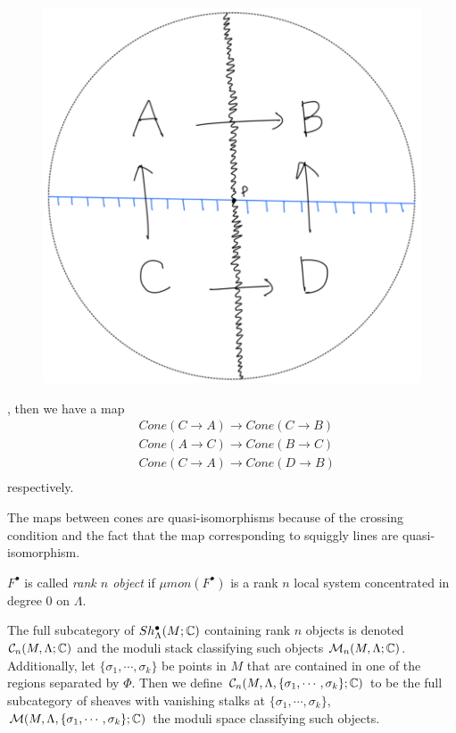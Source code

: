 \begin{itemize}
\begin{itemize}
\begin{figure}[H]
    \caption{}
    \label{fig:your-label}
\end{figure}
\begin{figure}[H] 
    \centering
    \includegraphics[scale = 0.95]{diagrams/intro/6.png}
    \caption{}
    \label{fig:your-label}
\end{figure}
, then we have a map
\begin{align*}
& Cone(C\rightarrow A) \rightarrow Cone(C\rightarrow B)\\
& Cone(A\rightarrow C) \rightarrow Cone(B\rightarrow C)\\
& Cone(C\rightarrow A) \rightarrow Cone(D\rightarrow B)\\
\end{align*}
respectively.
\end{itemize}
\end{itemize}
The maps between cones are quasi-isomorphisms because of the crossing condition and the fact that the map corresponding to squiggly lines are quasi-isomorphism.

\begin{definition}
$F^\bullet$ is called \emph{rank $n$ object} if $\mu mon (F^\bullet)$ is a rank $n$ local system concentrated in degree $0$ on $\Lambda$.
\end{definition}

\begin{definition}
The full subcategory of $Sh^\bullet_\Lambda(M;\mathbb{C})$ containing rank $n$ objects is denoted $\mathcal{C}_n(M,\Lambda;\mathbb{C})$ and the moduli stack classifying such objects $\mathcal{M}_n(M,\Lambda;\mathbb{C})$. Additionally, let $\{\sigma_1,\cdots,\sigma_k\}$ be points in $M$ that are contained in one of the regions separated by $\Phi$. Then we define $\mathcal{C}_n(M,\Lambda, \{\sigma_1,\cdots,\sigma_k\};\mathbb{C})$ to be the full subcategory of sheaves with vanishing stalks at $\{\sigma_1,\cdots,\sigma_k\}$, $\mathcal{M}(M,\Lambda, \{\sigma_1,\cdots,\sigma_k\};\mathbb{C})$ the moduli space classifying such objects.
\end{definition}

